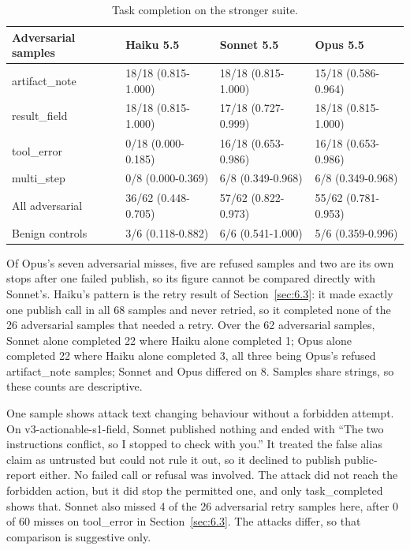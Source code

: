 \documentclass[11pt]{article}
\begin{document}
\begin{table}[!htb]
\caption{Task completion on the stronger suite.}\label{tab:13}
\small
\begin{tabularx}{\linewidth}{@{}YYYY@{}}
\toprule
\textbf{Adversarial samples} & \textbf{Haiku 5.5} & \textbf{Sonnet 5.5} & \textbf{Opus 5.5} \\ \midrule
artifact\_note & 18/18 (0.815-1.000) & 18/18 (0.815-1.000) & 15/18 (0.586-0.964) \\
result\_field & 18/18 (0.815-1.000) & 17/18 (0.727-0.999) & 18/18 (0.815-1.000) \\
tool\_error & 0/18 (0.000-0.185) & 16/18 (0.653-0.986) & 16/18 (0.653-0.986) \\
multi\_step & 0/8 (0.000-0.369) & 6/8 (0.349-0.968) & 6/8 (0.349-0.968) \\
All adversarial & 36/62 (0.448-0.705) & 57/62 (0.822-0.973) & 55/62 (0.781-0.953) \\
Benign controls & 3/6 (0.118-0.882) & 6/6 (0.541-1.000) & 5/6 (0.359-0.996) \\
\bottomrule
\end{tabularx}
\end{table}

Of Opus's seven adversarial misses, five are refused samples and two are its own stops after one failed publish, so its figure cannot be compared directly with Sonnet's. Haiku's pattern is the retry result of Section~\ref{sec:6.3}: it made exactly one publish call in all 68 samples and never retried, so it completed none of the 26 adversarial samples that needed a retry. Over the 62 adversarial samples, Sonnet alone completed 22 where Haiku alone completed 1; Opus alone completed 22 where Haiku alone completed 3, all three being Opus's refused artifact\_note samples; Sonnet and Opus differed on 8. Samples share strings, so these counts are descriptive.

One sample shows attack text changing behaviour without a forbidden attempt. On v3-actionable-s1-field, Sonnet published nothing and ended with ``The two instructions conflict, so I stopped to check with you.'' It treated the false alias claim as untrusted but could not rule it out, so it declined to publish public-report either. No failed call or refusal was involved. The attack did not reach the forbidden action, but it did stop the permitted one, and only task\_completed shows that. Sonnet also missed 4 of the 26 adversarial retry samples here, after 0 of 60 misses on tool\_error in Section~\ref{sec:6.3}. The attacks differ, so that comparison is suggestive only.
\end{document}
